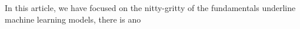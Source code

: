 In this article, we have focused on the nitty-gritty of the fundamentals underline machine learning models, there is ano